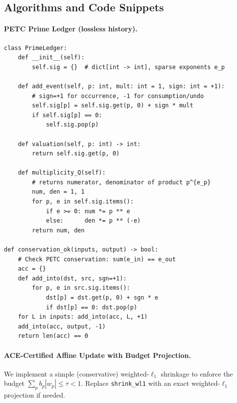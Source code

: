 \documentclass[11pt]{article}
\theoremstyle{plain}
\theoremstyle{definition}
\theoremstyle{remark}
\begin{document}
\subsection{Algorithms and Code Snippets}

\paragraph{PETC Prime Ledger (lossless history).}
\begin{verbatim}
class PrimeLedger:
    def __init__(self):
        self.sig = {}  # dict[int -> int], sparse exponents e_p

    def add_event(self, p: int, mult: int = 1, sign: int = +1):
        # sign=+1 for occurrence, -1 for consumption/undo
        self.sig[p] = self.sig.get(p, 0) + sign * mult
        if self.sig[p] == 0:
            self.sig.pop(p)

    def valuation(self, p: int) -> int:
        return self.sig.get(p, 0)

    def multiplicity_Q(self):
        # returns numerator, denominator of product p^{e_p}
        num, den = 1, 1
        for p, e in self.sig.items():
            if e >= 0: num *= p ** e
            else:      den *= p ** (-e)
        return num, den

def conservation_ok(inputs, output) -> bool:
    # Check PETC conservation: sum(e_in) == e_out
    acc = {}
    def add_into(dst, src, sgn=+1):
        for p, e in src.sig.items():
            dst[p] = dst.get(p, 0) + sgn * e
            if dst[p] == 0: dst.pop(p)
    for L in inputs: add_into(acc, L, +1)
    add_into(acc, output, -1)
    return len(acc) == 0
\end{verbatim}

\paragraph{ACE-Certified Affine Update with Budget Projection.}
We implement a simple (conservative) weighted-$\ell_1$ shrinkage to enforce the budget
$\sum_p b_p |w_p| \le \tau < 1$. Replace \texttt{shrink\_wl1} with an exact weighted-$\ell_1$ projection if needed.
\end{document}
